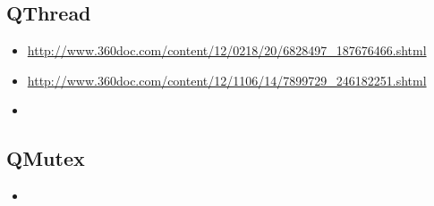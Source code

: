 \documentclass[9pt,b5paper]{article}
\begin{document}
\subsection{QThread}
\label{sec-14-22}
\begin{itemize}
\item \url{http://www.360doc.com/content/12/0218/20/6828497_187676466.shtml}
\item \url{http://www.360doc.com/content/12/1106/14/7899729_246182251.shtml}
\item 
\end{itemize}
\subsection{QMutex}
\label{sec-14-23}
\begin{itemize}
\item 
\end{itemize}
\end{document}
